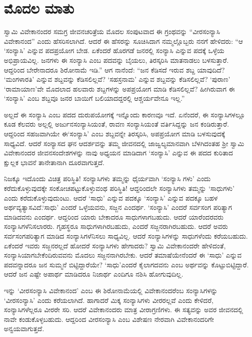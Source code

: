 
\chapter*{ಮೊದಲ ಮಾತು}

\noindent

ಸ್ವಾಮಿ ವಿವೇಕಾನಂದರ ಸಮಗ್ರ ಜೀವನಚರಿತ್ರೆಯ ಮೊದಲ ಸಂಪುಟವಾದ ಈ ಗ್ರಂಥವನ್ನು “ವೀರಸಂನ್ಯಾಸಿ ವಿವೇಕಾನಂದ” ಎಂದು ಹೆಸರಿಸಲಾಗಿದೆ. ಆದರೆ ಈ ಹೆಸರನ್ನು ಸೂಚಿಸಿದಾಗ ನಮ್ಮಲ್ಲೊಬ್ಬರು ನನಗೆ ಹೇಳಿದರು: “ಆ ‘ಸಂನ್ಯಾಸಿ’ ಎನ್ನುವ ಪದಪ್ರಯೋಗ ಬೇಡ. ಏಕೆಂದರೆ ಹೊರಗಡೆ ಜನರಲ್ಲಿ ಸಂನ್ಯಾಸಿ ಎನ್ನುವ ಪದಕ್ಕೆ ಒಳ್ಳೆಯ ಅಭಿಪ್ರಾಯವಿಲ್ಲ. ಜನಗಳು ಈ ಸಂನ್ಯಾಸಿ ಎಂಬ ಪದವನ್ನು ಬೈಯಲು, ತಿರಸ್ಕರಿಸಿ ಮಾತನಾಡಲು ಬಳಸುತ್ತಾರೆ. ಆದ್ದರಿಂದ ಬೇರೇನಾದರೂ ಶಿರೋನಾಮೆ ಇಡಿ.” ಆಗ ನಾನೆಂದೆ: “ಜನ ಕೆಡಿಸದೆ ಇರುವ ಶಬ್ದ ಯಾವುದಿದೆ? ‘ಮಂಗಳಾರತಿ’ ಎನ್ನುವ ಶಬ್ದವನ್ನು ಕೆಡಿಸಲಿಲ್ಲವೆ? ‘ಸಹಸ್ರನಾಮ’ ಎನ್ನುವ ಶಬ್ದವನ್ನು ಕೆಡಿಸಲಿಲ್ಲವೆ? ‘ಪುರಾಣ’ ‘ರಾಮಾಯಾಣ’ವೇ ಮೊದಲಾದ ಹಲವಾರು ಶಬ್ದಗಳನ್ನು ಅಪಪ್ರಯೋಗ ಮಾಡಿ ಕೆಡಿಸಲಿಲ್ಲವೆ? ಹೀಗಿರುವಾಗ ಈ ‘ಸಂನ್ಯಾಸಿ’ ಎಂಬ ಶಬ್ದವೂ ಜನರ ಬಾಯಿಗೆ ಬಲಿಯಾದದ್ದರಲ್ಲಿ ಆಶ್ಚರ್ಯವೇನೂ ಇಲ್ಲ.”

ಅಲ್ಲದೆ ಈ ಸಂನ್ಯಾಸಿ ಎಂಬ ಪದದ ದುರುಪಯೋಗಕ್ಕೆ ಇನ್ನೊಂದು ಕಾರಣವೂ ಇದೆ. ಏನೆಂದರೆ, ಈ ಸಂನ್ಯಾಸಿಗಳಲ್ಲೂ ಕೂಡ ಕೆಲವರು ಅಲ್ಲಲ್ಲಿ ಅರ್ಜುನಸಂನ್ಯಾಸಿಯಂತೆ, ರಾವಣ ಸಂನ್ಯಾಸಿಯಂತೆ ವರ್ತಿಸಿದ್ದನ್ನು ಜನ ಕಂಡಿರುತ್ತಾರೆ. ಆದ್ದರಿಂದ ಸಹಜವಾಗಿಯೇ ಈ‘ಸಂನ್ಯಾಸಿ’ ಎಂಬ ಶಬ್ದವನ್ನೇ ತಿರಸ್ಕರಿಸಿ, ಅಪಪ್ರಯೋಗ ಮಾಡಿ ಬಳಸುವುದಕ್ಕೆ ಸಾಧ್ಯವಿದೆ. ಆದರೆ ಸಂನ್ಯಾಸದ ಘನ ಆದರ್ಶವನ್ನು ತಮ್ಮ ಜೀವನದಲ್ಲಿ ಜಾಜ್ವಲ್ಯಮಾನವಾಗಿ ಬೆಳಗಿದಂತಹ ಶ್ರೀ ಸ್ವಾಮಿ ವಿವೇಕಾನಂದರ ಜೀವನ\eng{-}ಸಂದೇಶಗಳನ್ನು ನಾವು ಅಧ್ಯಯನ ಮಾಡಿದಾಗ ‘ಸಂನ್ಯಾಸಿ’ ಎನ್ನುವ ಈ ಪದದ ಕುರಿತಾದ ಕ್ಷುಲ್ಲಕ ಭಾವನೆ ತಾನೇತಾನಾಗಿ ದೂರವಾಗುತ್ತದೆ.

ನಿಜಕ್ಕೂ ಇದೊಂದು ವಿಚಿತ್ರ ಪರಿಸ್ಥಿತಿ! ಸಂನ್ಯಾಸಿಗಳು ತಮ್ಮನ್ನು ಧೈರ್ಯವಾಗಿ ‘ಸಂನ್ಯಾಸಿ ಗಳು’ ಎಂದು ಕರೆದುಕೊಳ್ಳುವುದಕ್ಕೇ ಸಂಕೋಚಪಟ್ಟುಕೊಳ್ಳುವಂಥ ಪರಿಸ್ಥಿತಿ! ಆದ್ದರಿಂದಲೇ ಸಂನ್ಯಾಸಿಗಳು ತಮ್ಮನ್ನು ‘ಸಾಧುಗಳು’ ಎಂದು ಕರೆದುಕೊಳ್ಳುವುದುಂಟು. ಆದರೆ ‘ಸಾಧು’ ಎನ್ನುವ ಪದಕ್ಕೂ ‘ಸಂನ್ಯಾಸಿ’ ಎನ್ನುವ ಪದಕ್ಕೂ ಬಹಳ ಅರ್ಥವ್ಯತ್ಯಾಸವಿದೆ.‘ಸಾಧು’ ಎಂದರೆ ಒಳ್ಳೆಯವನು, ಸಜ್ಜನ ಎಂದರ್ಥ. ‘ಸಂನ್ಯಾಸಿ’ ಎಂದರೆ ಸರ್ವಸಂಗ ಪರಿತ್ಯಾಗ ಮಾಡಿದವನು ಎಂದರ್ಥ. ಆದ್ದರಿಂದ ಯಾರು ಬೇಕಾದರೂ ಸಾಧುಗಳಾಗಬಹುದು. ಆದರೆ ಯಾರೆಂದರವರು ಸಂನ್ಯಾಸಿಗಳೆನಿಸಲಾರರು. ಗೃಹಸ್ಥರೂ ಸಾಧುಗಳಾಗಿರಬಹುದು, ಎಂದರೆ ಸಜ್ಜನರಾಗಿರಬಹುದು. ಆದರೆ ಅವರು ಸರ್ವಸಂಗಪರಿತ್ಯಾಗ ಮಾಡಿದ ಸಂನ್ಯಾಸಿಗಳೆನಿಸಲು ಸಾಧ್ಯವಿಲ್ಲ. ಆದರೆ ಸಂನ್ಯಾಸಿಗಳನ್ನು ಸಾಧುಗಳೆಂದು ಕರೆಯಬಹುದು. ಏಕೆಂದರೆ ಇವರು ಸಜ್ಜನರಲ್ಲದೆ ಹೋದರೆ ಸಂನ್ಯಾಸಿಗಳು ಹೇಗಾದರು? ಸ್ವಾಮಿ ವಿವೇಕಾನಂದರೇ ಹೇಳಿದಂತೆ, ಸಂನ್ಯಾಸಿಯಾಗಬೇಕೆಂದಿರುವವನು ಮೊದಲು ಸಜ್ಜನನಾಗಿರಬೇಕು. ಆದರೆ ತಮಾಷೆಯೇನೆಂದರೆ ಈ ‘ಸಾಧು’ ಎನ್ನುವ ಪದವನ್ನಾದರೂ ಜನ ಸುಮ್ಮನೆ ಬಿಟ್ಟಿದ್ದಾರೆಯೇ? ‘ಸಾಧು’ಎಂದರೆ ಕೈಲಾಗದವನು ಎಂಬ ಅರ್ಥವನ್ನು ಕೊಟ್ಟುಬಿಟ್ಟಿದ್ದಾರೆ. ಆದರೆ ಜನ ಎಷ್ಟೇ ಅಪಾರ್ಥ ಮಾಡಿದರೂ ನಿಜಾರ್ಥ ಎಂದಿಗೂ ನಶಿಸಿ ಹೋಗುವುದಿಲ್ಲ.

ಇನ್ನು ‘ವೀರಸಂನ್ಯಾಸಿ ವಿವೇಕಾನಂದ’ ಎಂಬ ಈ ಶಿರೋನಾಮೆಯಲ್ಲಿ ವಿವೇಕಾನಂದರೆಂಬ ಸಂನ್ಯಾಸಿಗಳನ್ನು ‘ವೀರಸಂನ್ಯಾಸಿ’ ಎಂದು ಕರೆಯಲಾಗಿದೆ. ಹಾಗಾದರೆ ಮಿಕ್ಕ ಸಂನ್ಯಾಸಿಗಳು ವೀರರಲ್ಲವೆ ಎಂದು ಕೇಳಿದರೆ, ಸಂನ್ಯಾಸಿಗಳೆಲ್ಲರೂ ವೀರರೇ ಸರಿ. ಆದರೆ ವಿವೇಕಾನಂದರು ಮಾತ್ರ ವೀರಾಗ್ರಣಿಗಳು. ಈ ಸತ್ಯವನ್ನು ಅವರ ಜೀವನದಲ್ಲಿ ನಾವೇ ಕಂಡುಕೊಳ್ಳಬಹುದು. ಆದ್ದರಿಂದ ವೀರಸಂನ್ಯಾಸಿ ಎಂಬ ವಿಶೇಷಣ ನೇರವಾಗಿ ವಿವೇಕಾನಂದರಿಗೇ ಅನ್ವಯವಾಗುತ್ತದೆ.

